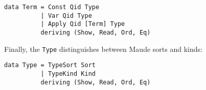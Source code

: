 \begin{itemize}
{\codesize
\begin{verbatim}
data Term = Const Qid Type
          | Var Qid Type
          | Apply Qid [Term] Type
          deriving (Show, Read, Ord, Eq)
\end{verbatim}
}

Finally, the \verb"Type" distinguishes between Maude sorts and kinds:

{\codesize
\begin{verbatim}
data Type = TypeSort Sort
          | TypeKind Kind
          deriving (Show, Read, Ord, Eq)
\end{verbatim}
}

\end{itemize}
























